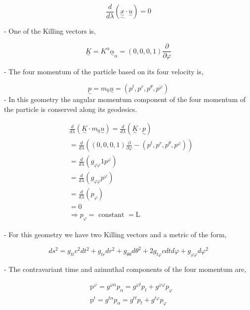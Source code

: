 $$
    \frac{d}{d \lambda}(\underset{\sim}{\underset{\sim}{x}} \cdot \underset{\sim}{u})=0
$$

- One of the Killing vectors is,

$$
    \underset{\sim}{K}=K^\alpha{\underset{\sim}{\alpha}}_\alpha=(0,0,0,1) \frac{\partial}{\partial \varphi}
$$

- The four momentum of the particle based on its four velocity is,

$$
    \underset{\sim}{p}=m_0 \underset{\sim}{u}=\left(p^t, p^r, p^\theta, p^{\varphi}\right)
$$
- In this geometry the angular momentum component of the four momentum of the particle is conserved along its geodesics.


\begin{align}
     & \frac{d}{d \lambda}\left(\underset{\sim}{K} \cdot m_0 \underset{\sim}{u}\right)=\frac{d}{d \lambda}(\underset{\sim}{K} \cdot \underset{\sim}{p}) \\
     & =\frac{d}{d \lambda}\left((0,0,0,1) \frac{\partial}{\partial \varphi}-\left(p^t, p^r, p^\theta, p^{\varphi}\right)\right)                        \\
     & =\frac{d}{d \lambda}\left(g_{\varphi \varphi} 1 p^{\varphi}\right)                                                                               \\
     & =\frac{d}{d \lambda}\left(g_{\varphi \varphi} p^{\varphi}\right)                                                                                 \\
     & =\frac{d}{d \lambda}\left(p_{\varphi}\right)                                                                                                     \\
     & =0                                                                                                                                               \\
     & \Rightarrow p_{\varphi}=\text { constant }=\mathrm{L}
\end{align}

- For this geometry we have two Killing vectors and a metric of the form,

$$
    d s^2=g_{t t} c^2 d t^2+g_{t r} d r^2+g_{\theta \theta} d \theta^2+2 g_{t \varphi} c d t d \varphi+g_{\varphi \varphi} d \varphi^2
$$

- The contravariant time and azimuthal components of the four momentum are,


\begin{align}
     & \mathrm{p}^{\varphi}=g^{\varphi \alpha} p_\alpha=g^{\varphi t} p_t+g^{\varphi \varphi} p_{\varphi} \\
     & \mathrm{p}^t=g^{t \alpha} p_\alpha=g^{t t} p_t+g^{t \varphi} p_{\varphi}
\end{align}


